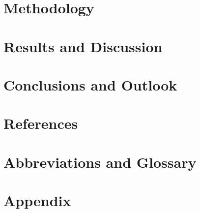 \section{Methodology}
\label{sec:method}


\section{Results and Discussion}


%

\section{Conclusions and Outlook}


\clearpage
\section{References}
\printbibliography[heading=none]

\clearpage
\section*{Abbreviations and Glossary}
\printglossaries

\clearpage
\section{Appendix}
\label{sec:appendix}


